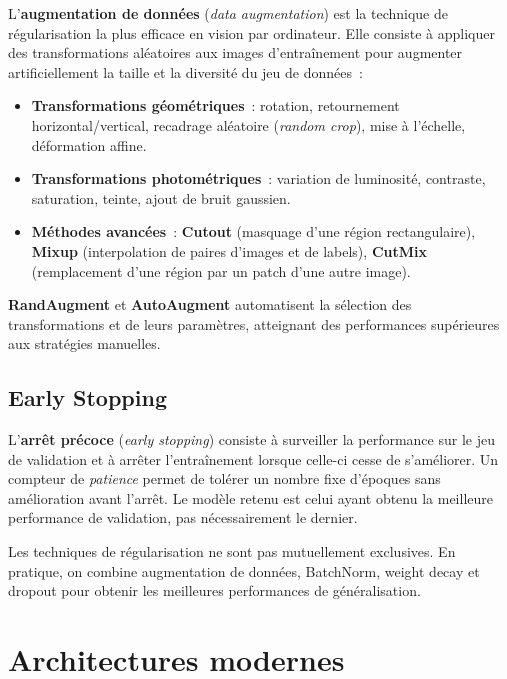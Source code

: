\documentclass[a4paper,11pt,twoside]{book}
\begin{document}
L'\textbf{augmentation de données} (\textit{data augmentation}) est la technique de régularisation la plus efficace en vision par ordinateur. Elle consiste à appliquer des transformations aléatoires aux images d'entraînement pour augmenter artificiellement la taille et la diversité du jeu de données~:

\begin{itemize}[leftmargin=2em]
  \item \textbf{Transformations géométriques}~: rotation, retournement horizontal/vertical, recadrage aléatoire (\textit{random crop}), mise à l'échelle, déformation affine.
  \item \textbf{Transformations photométriques}~: variation de luminosité, contraste, saturation, teinte, ajout de bruit gaussien.
  \item \textbf{Méthodes avancées}~: \textbf{Cutout} (masquage d'une région rectangulaire), \textbf{Mixup} (interpolation de paires d'images et de labels), \textbf{CutMix} (remplacement d'une région par un patch d'une autre image).
\end{itemize}

\textbf{RandAugment} et \textbf{AutoAugment} automatisent la sélection des transformations et de leurs paramètres, atteignant des performances supérieures aux stratégies manuelles.

\section{Early Stopping}

L'\textbf{arrêt précoce} (\textit{early stopping}) consiste à surveiller la performance sur le jeu de validation et à arrêter l'entraînement lorsque celle-ci cesse de s'améliorer. Un compteur de \textit{patience} permet de tolérer un nombre fixe d'époques sans amélioration avant l'arrêt. Le modèle retenu est celui ayant obtenu la meilleure performance de validation, pas nécessairement le dernier.

\begin{notebox}[Résumé]
Les techniques de régularisation ne sont pas mutuellement exclusives. En pratique, on combine augmentation de données, BatchNorm, weight decay et dropout pour obtenir les meilleures performances de généralisation.
\end{notebox}


\chapter{Architectures modernes}
\end{document}
